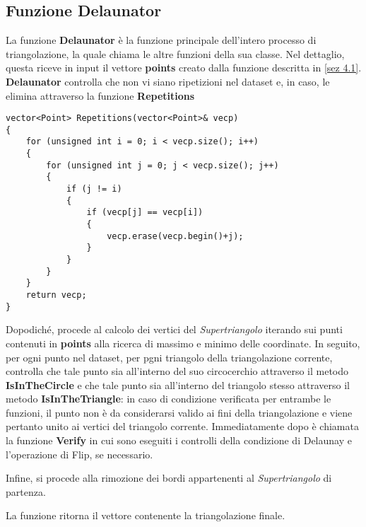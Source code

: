 \documentclass{article}
\begin{document}
\subsection{Funzione Delaunator}
La funzione \textbf{Delaunator} è la funzione principale dell'intero processo di triangolazione,  la quale chiama le altre funzioni della sua classe.  
Nel dettaglio,  questa riceve in input il vettore \textbf{points} creato dalla funzione descritta in \ref{sez 4.1}.  \textbf{Delaunator} controlla che non vi siano ripetizioni nel dataset e,  in caso,  le elimina attraverso la funzione \textbf{Repetitions}
\begin{lstlisting}
vector<Point> Repetitions(vector<Point>& vecp)
{
    for (unsigned int i = 0; i < vecp.size(); i++)
    {
        for (unsigned int j = 0; j < vecp.size(); j++)
        {
            if (j != i)
            {
                if (vecp[j] == vecp[i])
                {
                    vecp.erase(vecp.begin()+j);
                }
            }
        }
    }
    return vecp;
}
\end{lstlisting}
Dopodiché,  procede al calcolo dei vertici del \emph{Supertriangolo} iterando sui punti contenuti in \textbf{points} alla ricerca di massimo e minimo delle coordinate.
In seguito,  per ogni punto nel dataset,  per pgni triangolo della triangolazione corrente,  controlla che tale punto sia all'interno del suo circocerchio attraverso il metodo \textbf{IsInTheCircle} e che tale punto sia all'interno del triangolo stesso attraverso il metodo \textbf{IsInTheTriangle}: in caso di condizione verificata per entrambe le funzioni,  il punto non è da considerarsi valido ai fini della triangolazione e viene pertanto unito ai vertici del triangolo corrente.  Immediatamente dopo è chiamata la funzione \textbf{Verify} in cui sono eseguiti i controlli della condizione di Delaunay e l'operazione di Flip, se necessario.

\noindent Infine,  si procede alla rimozione dei bordi appartenenti al \emph{Supertriangolo} di partenza.

\noindent La funzione ritorna il vettore contenente la triangolazione finale.
\end{document}
